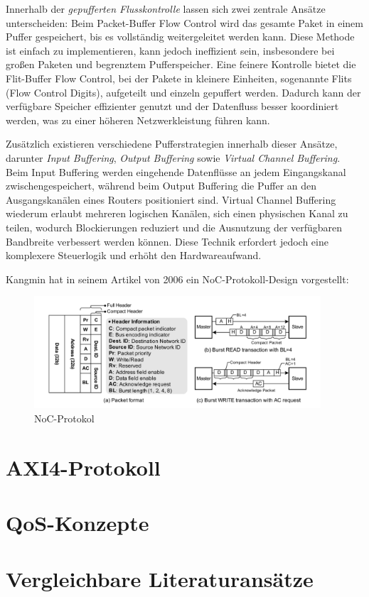 Innerhalb der \textit{gepufferten Flusskontrolle} lassen sich zwei zentrale Ansätze unterscheiden: Beim Packet-Buffer Flow Control wird das gesamte Paket in einem Puffer gespeichert, bis es vollständig weitergeleitet werden kann. Diese Methode ist einfach zu implementieren, kann jedoch ineffizient sein, insbesondere bei großen Paketen und begrenztem Pufferspeicher. Eine feinere Kontrolle bietet die Flit-Buffer Flow Control, bei der Pakete in kleinere Einheiten, sogenannte Flits (Flow Control Digits), aufgeteilt und einzeln gepuffert werden. Dadurch kann der verfügbare Speicher effizienter genutzt und der Datenfluss besser koordiniert werden, was zu einer höheren Netzwerkleistung führen kann.

Zusätzlich existieren verschiedene Pufferstrategien innerhalb dieser Ansätze, darunter \textit{Input Buffering}, \textit{Output Buffering} sowie \textit{Virtual Channel Buffering}. Beim Input Buffering werden eingehende Datenflüsse an jedem Eingangskanal zwischengespeichert, während beim Output Buffering die Puffer an den Ausgangskanälen eines Routers positioniert sind. Virtual Channel Buffering wiederum erlaubt mehreren logischen Kanälen, sich einen physischen Kanal zu teilen, wodurch Blockierungen reduziert und die Ausnutzung der verfügbaren Bandbreite verbessert werden können. Diese Technik erfordert jedoch eine komplexere Steuerlogik und erhöht den Hardwareaufwand.

Kangmin hat in seinem Artikel von 2006 ein NoC-Protokoll-Design vorgestellt:
\begin{figure}[htbp]
    \centering
    \includegraphics[width=0.95\textwidth]{img/NoC Protocol.png}
    \caption{NoC-Protokol~\cite{kangmin_low-power_2006}}\label{fig:NOC_Protocol}
\end{figure}



\section{AXI4-Protokoll}

\section{QoS-Konzepte}

\section{Vergleichbare Literaturansätze}
